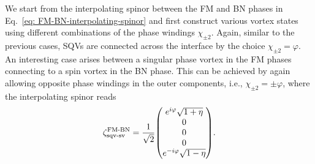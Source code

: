 We start from the interpolating spinor between the FM and BN phases in
Eq.~\eqref{eq: FM-BN-interpolating-spinor} and first construct various vortex
states using different combinations of the phase windings \(\chi_{\pm 2}\).
Again, similar to the previous cases, SQVs are connected across the interface
by the choice \(\chi_{\pm 2} = \varphi \).
An interesting case arises between a singular phase vortex in the FM phases
connecting to a spin vortex in the BN phase.
This can be achieved by again allowing opposite phase windings in the outer
components, i.e., \(\chi_{\pm 2} = \pm \varphi \), where the interpolating
spinor reads
\begin{align}\label{eq: FM-BN-sqv-sv}
    \zeta^\text{FM-BN}_\text{sqv-sv} = \frac{1}{\sqrt{2}}\mqty(
    e^{i\varphi} \sqrt{1 + \eta} \\
    0 \\
    0 \\
    0 \\
    e^{-i\varphi} \sqrt{1 - \eta}).
\end{align}

